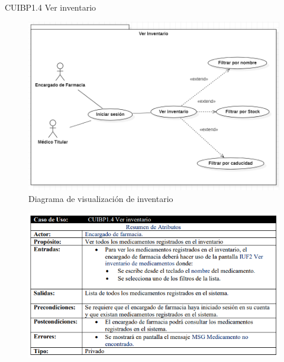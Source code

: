 \documentclass[12pt,letterpaper]{article}
\begin{document}
            \newpage
            CUIBP1.4 Ver inventario 
            \begin{figure}[H]
                \centering
                \includegraphics [scale=0.5]{casosUso/verInventario}
                \caption{Diagrama de visualización de inventario}
            \end{figure}
            \begin{figure}[H]
                \centering
                \includegraphics [scale=0.8]{specs/specVerInventario}
            \end{figure}
\end{document}
